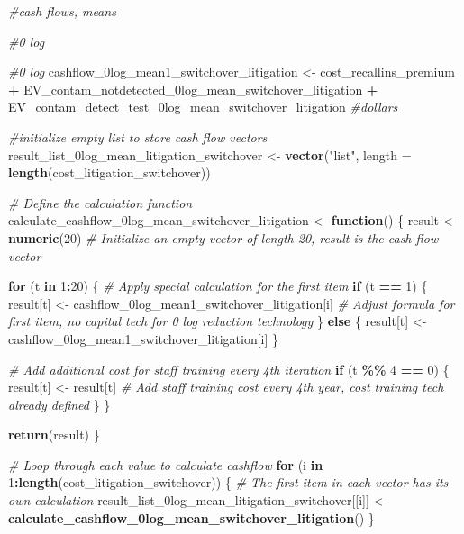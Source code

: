 \documentclass[
]{article}
\newenvironment{Shaded}{\begin{snugshade}}{\end{snugshade}}
\newcommand{\AttributeTok}[1]{\textcolor[rgb]{0.13,0.29,0.53}{#1}}
\newcommand{\CommentTok}[1]{\textcolor[rgb]{0.56,0.35,0.01}{\textit{#1}}}
\newcommand{\ControlFlowTok}[1]{\textcolor[rgb]{0.13,0.29,0.53}{\textbf{#1}}}
\newcommand{\DecValTok}[1]{\textcolor[rgb]{0.00,0.00,0.81}{#1}}
\newcommand{\FunctionTok}[1]{\textcolor[rgb]{0.13,0.29,0.53}{\textbf{#1}}}
\newcommand{\NormalTok}[1]{#1}
\newcommand{\OtherTok}[1]{\textcolor[rgb]{0.56,0.35,0.01}{#1}}
\newcommand{\SpecialCharTok}[1]{\textcolor[rgb]{0.81,0.36,0.00}{\textbf{#1}}}
\newcommand{\StringTok}[1]{\textcolor[rgb]{0.31,0.60,0.02}{#1}}
\begin{document}
\begin{Shaded}
\begin{Highlighting}[]
\CommentTok{\#cash flows, means}

\CommentTok{\#0 log}


\CommentTok{\#0 log}
\NormalTok{cashflow\_0log\_mean1\_switchover\_litigation }\OtherTok{\textless{}{-}}\NormalTok{ cost\_recallins\_premium }\SpecialCharTok{+}\NormalTok{ EV\_contam\_notdetected\_0log\_mean\_switchover\_litigation }\SpecialCharTok{+}\NormalTok{ EV\_contam\_detect\_test\_0log\_mean\_switchover\_litigation }\CommentTok{\#dollars}


\CommentTok{\#initialize empty list to store cash flow vectors}
\NormalTok{result\_list\_0log\_mean\_litigation\_switchover }\OtherTok{\textless{}{-}} \FunctionTok{vector}\NormalTok{(}\StringTok{"list"}\NormalTok{, }\AttributeTok{length =} \FunctionTok{length}\NormalTok{(cost\_litigation\_switchover))}


\CommentTok{\# Define the calculation function}
\NormalTok{calculate\_cashflow\_0log\_mean\_switchover\_litigation }\OtherTok{\textless{}{-}} \ControlFlowTok{function}\NormalTok{() \{}
\NormalTok{  result }\OtherTok{\textless{}{-}} \FunctionTok{numeric}\NormalTok{(}\DecValTok{20}\NormalTok{)  }\CommentTok{\# Initialize an empty vector of length 20, result is the cash flow vector}
  
  \ControlFlowTok{for}\NormalTok{ (t }\ControlFlowTok{in} \DecValTok{1}\SpecialCharTok{:}\DecValTok{20}\NormalTok{) \{}
    \CommentTok{\# Apply special calculation for the first item}
    \ControlFlowTok{if}\NormalTok{ (t }\SpecialCharTok{==} \DecValTok{1}\NormalTok{) \{}
\NormalTok{      result[t] }\OtherTok{\textless{}{-}}\NormalTok{ cashflow\_0log\_mean1\_switchover\_litigation[i] }\CommentTok{\# Adjust formula for first item, no capital tech for 0 log reduction technology}
\NormalTok{    \} }\ControlFlowTok{else}\NormalTok{ \{}
\NormalTok{      result[t] }\OtherTok{\textless{}{-}}\NormalTok{ cashflow\_0log\_mean1\_switchover\_litigation[i]}
\NormalTok{    \}}
    
    \CommentTok{\# Add additional cost for staff training every 4th iteration}
    \ControlFlowTok{if}\NormalTok{ (t }\SpecialCharTok{\%\%} \DecValTok{4} \SpecialCharTok{==} \DecValTok{0}\NormalTok{) \{}
\NormalTok{      result[t] }\OtherTok{\textless{}{-}}\NormalTok{ result[t]  }\CommentTok{\# Add staff training cost every 4th year, cost training tech already defined}
\NormalTok{    \}}
\NormalTok{  \}}
  
  \FunctionTok{return}\NormalTok{(result)}
\NormalTok{\}}

\CommentTok{\# Loop through each value to calculate cashflow}
\ControlFlowTok{for}\NormalTok{ (i }\ControlFlowTok{in} \DecValTok{1}\SpecialCharTok{:}\FunctionTok{length}\NormalTok{(cost\_litigation\_switchover)) \{}
  \CommentTok{\# The first item in each vector has its own calculation}
\NormalTok{  result\_list\_0log\_mean\_litigation\_switchover[[i]] }\OtherTok{\textless{}{-}} \FunctionTok{calculate\_cashflow\_0log\_mean\_switchover\_litigation}\NormalTok{()}
\NormalTok{\}}





\end{Highlighting}
\end{Shaded}
\end{document}

